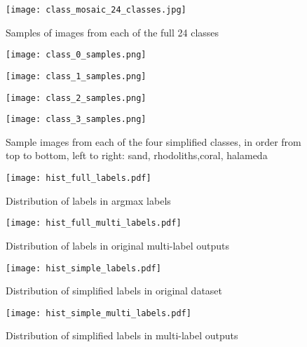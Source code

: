 \begin{figure}
    \texttt{[image: class\_mosaic\_24\_classes.jpg]}
    \caption{Samples of images from each of the full 24 classes }
    \label{fig:24classes}
\end{figure}


\begin{figure}
    \begin{minipage}{.45\linewidth}
        \texttt{[image: class\_0\_samples.png]}
    \end{minipage}
    \hfill
    \begin{minipage}{.45\linewidth}
        \texttt{[image: class\_1\_samples.png]}
    \end{minipage}
    \vfill
    \begin{minipage}{.45\linewidth}
        \texttt{[image: class\_2\_samples.png]}
    \end{minipage}
    \hfill
    \begin{minipage}{.45\linewidth}
        \texttt{[image: class\_3\_samples.png]}
    \end{minipage}
    \caption{Sample images from each of the four simplified classes, in order from top to bottom, left to right: sand, rhodoliths,coral, halameda}
    \label{fig:4classes}
\end{figure}

\begin{figure}
    \begin{minipage}{.47\linewidth}
        \texttt{[image: hist\_full\_labels.pdf]}
        \caption{Distribution of labels in argmax labels}
        \label{fig:singlelabeldistr}
    \end{minipage}
    \hfill
    \begin{minipage}{.47\linewidth}
        \texttt{[image: hist\_full\_multi\_labels.pdf]}
        \caption{Distribution of labels in original multi-label outputs}
        \label{fig:multilabeldistr}
    \end{minipage}
    \begin{minipage}{.47\linewidth}
        \texttt{[image: hist\_simple\_labels.pdf]}
        \caption{Distribution of simplified labels in original dataset}
        \label{fig:singlelabeldistr}
    \end{minipage}
    \hfill
    \begin{minipage}{.47\linewidth}
        \texttt{[image: hist\_simple\_multi\_labels.pdf]}
        \caption{Distribution of simplified labels in multi-label outputs}
        \label{fig:multilabeldistr}
    \end{minipage}
\end{figure}

